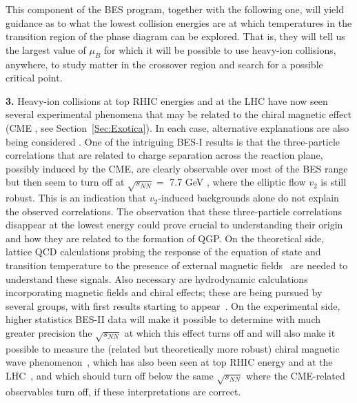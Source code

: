This component of the BES program, together with the following one,
will yield guidance as to what the lowest collision energies are at
which temperatures in the transition region of the phase diagram can
be explored. That is, they will tell us the largest value of  $\mu_B$ 
for which it will be
possible to use heavy-ion collisions, anywhere, to study matter in the
crossover region and search for a possible critical point.

{\bf 3.} Heavy-ion collisions at top RHIC energies and at the LHC have
now seen several experimental phenomena
\cite{Abelev:2009ac,Abelev:2012pa,Adamczyk:2013kcb} that may be
related to the chiral magnetic effect (CME
\cite{Fukushima:2008xe,Kharzeev:2010gr}, see Section~\ref{Sec:Exotica}). In
each case, alternative explanations are also being considered
\cite{Bzdak:2009fc,Pratt:2010zn}. One of the intriguing BES-I results
is that the three-particle correlations that are related to charge
separation across the reaction plane, possibly induced by the CME, are
clearly observable over most of the BES range but then seem to turn
off at $\sqrt{s_{NN}}=$ 7.7 GeV \cite{Adamczyk:2014mzf}, where the
elliptic flow $v_2$ is still robust. This is an indication that
$v_2$-induced backgrounds alone do not explain the observed
correlations. The observation that these three-particle correlations
disappear at the lowest energy could prove crucial to understanding
their origin and how they are related to the formation of QGP. On the
theoretical side, lattice QCD calculations probing the response of the
equation of state and transition temperature to the presence of
external magnetic fields~\cite{DElia:2010nq,Bali:2011qj,Bali:2014kia} are needed
to understand these signals.
Also necessary are hydrodynamic calculations incorporating magnetic fields and
chiral effects; these are being pursued by several groups, with
first results starting to appear~\cite{Hirono:2014oda}. On
the experimental side, higher statistics BES-II data will make it
possible to determine with much greater precision the $\sqrt{s_{NN}}$
at which this effect turns off and will also make it possible to
measure the (related but theoretically more robust) chiral magnetic
wave phenomenon~\cite{Kharzeev:2010gd,Burnier:2011bf}, which has also
been seen at top RHIC energy and at the LHC~\cite{Wang:2012qs,Belmont:2014lta}, 
and which should turn off below the
same $\sqrt{s_{NN}}$ where the CME-related observables
turn off, if these interpretations are correct.

